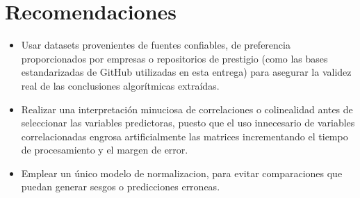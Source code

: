 \documentclass[12pt]{report}
\begin{document}
\section*{Recomendaciones}
\begin{itemize}
    \item Usar datasets provenientes de fuentes confiables, de preferencia proporcionados por empresas o repositorios de prestigio (como las bases estandarizadas de GitHub utilizadas en esta entrega) para asegurar la validez real de las conclusiones algorítmicas extraídas.
    \item Realizar una interpretación minuciosa de correlaciones o colinealidad antes de seleccionar las variables predictoras, puesto que el uso innecesario de variables correlacionadas engrosa artificialmente las matrices incrementando el tiempo de procesamiento y el margen de error.
    \item Emplear un único modelo de normalizacion, para evitar comparaciones que puedan generar sesgos o predicciones erroneas.
\end{itemize}

\vspace{0.5cm}

\renewcommand{\bibname}{\MakeUppercase{REFERENCIAS}}


\end{document}
